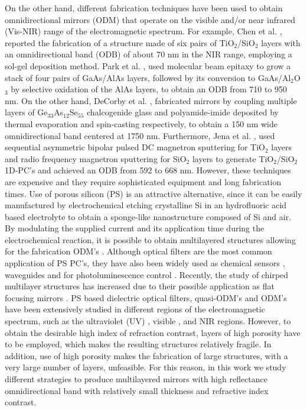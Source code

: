 \documentclass[a4paper,fleqn]{cas-sc}
\begin{document}
	On the other hand, different fabrication techniques have been used to
	obtain omnidirectional mirrors (ODM) that operate on the visible and/or
	near infrared (Vis-NIR) range of the electromagnetic spectrum. For
	example, Chen et al. \cite{Chen1999},
	reported the fabrication of a structure made of six pairs of
	TiO$_{2}$/SiO$_{2}$  layers with
	an omnidirectional band (ODB) of about 70 nm in the NIR range, employing a sol-gel deposition
	method. Park et al. \cite{Park2003}, used molecular beam epitaxy to
	grow a stack of four pairs of GaAs/AlAs layers, followed by its conversion to
	GaAs/Al$_{2}$O$_{3}$ by selective oxidation of the AlAs
	layers, to obtain an ODB from 710 to 950 nm.
	On the other hand, DeCorby et al. \cite{DeCorby2005}, fabricated mirrors by
	coupling multiple layers of Ge$_{33}$As$_{12}$Se$_{55}$ chalcogenide glass and
	polyamide-imide deposited by thermal evaporation and spin-casting
	respectively, to obtain a 150 nm wide omnidirectional band centered at
	1750 nm. Furthermore, Jena et al. \cite{Jena2019},
	used sequential asymmetric bipolar pulsed DC magnetron sputtering for TiO$%
	_{2}$ layers and radio frequency magnetron sputtering for SiO$_{2}$
	layers to generate TiO$_{2}$/SiO$_{2}$ 1D-PC's and achieved an ODB from
	592 to 668 nm. However, these techniques are expensive and they
	require sophisticated equipment and long fabrication times. Use of
	porous silicon (PS)
	is an attractive alternative, since it can be easily manufactured by
	electrochemical etching crystalline Si in an hydrofluoric
	acid based electrolyte to obtain a sponge-like nanostructure composed
	of Si and air. By modulating the supplied current and its application
	time during the electrochemical reaction, it is possible to obtain
	multilayered structures allowing for the fabrication ODM's \cite{Xifre2015,Pavesi2000}.
	Although optical filters \cite{Estevez2009,Ariza2014} are the most common
	application of PS PC's, they have also been widely used as chemical
	sensors \cite{Giusseppe2011,Agarwal2018}, waveguides \cite{Hussel1997} and
	for photoluminescence control \cite{Antunez2014}. Recently, the study of
	chirped multilayer structures has
	increased due to their possible application as flat focusing mirrors \cite{Wu2021,Kozar2017,Cheng2018}.
	PS based dielectric optical filters, quasi-ODM's and ODM's have been extensively studied in different
	regions of the electromagnetic spectrum, such as the ultraviolet (UV)
	\cite{Jimenez2020}, visible \cite{Ariza2012}, and NIR \cite{Bruyant2003} regions.
	However, to obtain the desirable high index of refraction
	contrast, layers of high porosity have to be employed, which makes the
	resulting structures relatively fragile. In addition, use of high
	porosity makes the fabrication of large structures, with a
	very large number of layers, unfeasible. For this reason, in this work
	we study different strategies to produce multilayered mirrors
	with high reflectance omnidirectional band
	with relatively small thickness and refractive index contrast.
	
\end{document}
